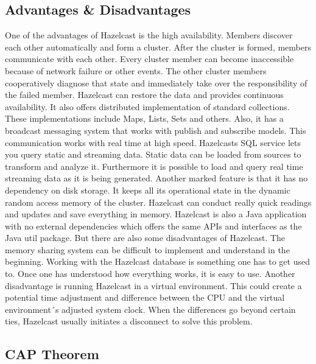 \subsection{Advantages \& Disadvantages} \label{subsec:advantagesDisadvantagesHazelcast}

One of the advantages of Hazelcast is the high availability. Members discover each other automatically and form a cluster. 
After the cluster is formed, members communicate with each other.  Every cluster member can become inaccessible because of network 
failure or other events. The other cluster members cooperatively diagnose that state and immediately take over the responsibility of the failed member. Hazelcast can restore the data and provides continuous availability. \newline
\noindent It also offers distributed implementation of standard collections. These implementations include Maps, Lists, Sets and others. Also, 
it has a broadcast messaging system that works with publish and subscribe models. This communication works with real time at high speed. 
Hazelcasts SQL service lets you query static and streaming data. Static data can be loaded from sources to transform and analyze it. 
Furthermore it is possible to load and query real time streaming data as it is being generated.
Another marked feature is that it has no dependency on disk storage. It keeps all its operational state in the dynamic random access 
memory of the cluster. Hazelcast can conduct really quick readings and updates and save everything in memory.
Hazelcast is also a Java application with no external dependencies which offers the same APIs and interfaces as the Java util package. \newline
\noindent But there are also some disadvantages of Hazelcast. The memory sharing system can be difficult to implement and understand in the 
beginning. Working with the Hazelcast database is something one has to get used to. Once one has understood how everything works, it is easy to use. 
Another disadvantage is running Hazelcast in a virtual environment. This could create a potential time adjustment and difference 
between the CPU and the virtual environment´s adjusted system clock. When the differences go beyond certain ties, Hazelcast usually 
initiates a disconnect to solve this problem. \parencite{Oguejiofor.05.10.2022}

\subsection{CAP Theorem} \label{subsec:capTheoremHazelcast}

